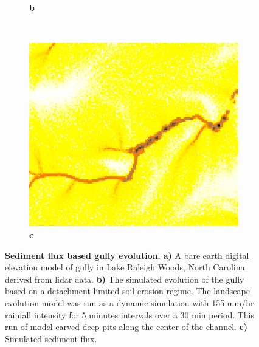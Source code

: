 \documentclass[final,3p,times,twocolumn]{elsarticle}
\begin{document}
\begin{figure}
\begin{subfigure}[b]{0.3\textwidth}
\label{fig_1_2}
\textbf{b} \\
\end{subfigure}
%
~ %
%
\begin{subfigure}[b]{0.3\textwidth}
\includegraphics[width=\textwidth]{images/lrwoods_dynamics_erdep_5m_30m_flux.png} %
\label{fig_1_3}
\textbf{c} \\
\end{subfigure}
%
\caption{{\bf Sediment flux based gully evolution.}
\textbf{a)}
A bare earth digital elevation model of gully in Lake Raleigh Woods, North Carolina derived from lidar data.
\textbf{b)}
The simulated evolution of the gully based on a detachment limited soil erosion regime.
The landscape evolution model was run as a dynamic simulation with 155 mm/hr rainfall intensity for 5 minutes intervals over a 30 min period.
This run of model carved deep pits along the center of the channel.
\textbf{c)}
Simulated sediment flux. 
}
\label{fig_1}
\end{figure}
\end{document}
